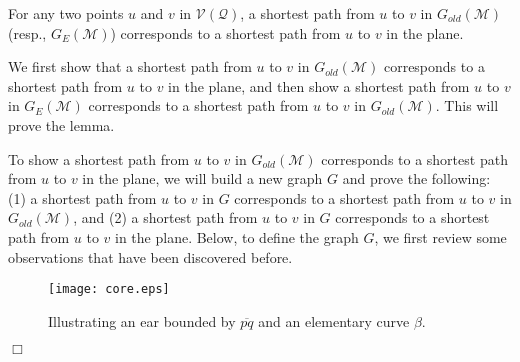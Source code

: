 \documentclass[english,runningheads,11pt]{llncs}
\def\calM{\mathcal{M}}
\def\calQ{\mathcal{Q}}
\def\calV{\mathcal{V}}
\newenvironment{proof}{\noindent {\textbf{Proof:}}\rm}{\hfill $\Box$\rm}
\begin{document}
\begin{lemma}\label{lem:40}
For any two points $u$ and $v$ in $\calV(\calQ)$,
a shortest path from $u$ to $v$ in $G_{old}(\calM)$ (resp., $G_E(\calM)$)
corresponds to a shortest path from $u$ to $v$ in the plane.
\end{lemma}
\begin{proof}
We first show that a shortest path from $u$ to $v$ in
$G_{old}(\calM)$ corresponds to a shortest
path from $u$ to $v$ in the plane, and then show a shortest path from $u$ to $v$ in
$G_E(\calM)$ corresponds to a shortest path from $u$ to $v$ in
$G_{old}(\calM)$. This will prove the lemma.


To show a shortest path from $u$ to $v$ in
$G_{old}(\calM)$ corresponds to a shortest
path from $u$ to $v$ in the plane, we will build a new graph $G$ and
prove the following: (1) a shortest path from $u$ to $v$ in $G$
corresponds to a shortest path from $u$ to $v$ in $G_{old}(\calM)$,
and (2) a shortest path from $u$ to $v$ in $G$ corresponds to a
shortest path from $u$ to $v$ in the plane. Below, to define the
graph $G$, we first review some observations that have been discovered
before.


\begin{figure}[t]
\begin{minipage}[t]{\linewidth}
\begin{center}
\texttt{[image: core.eps]}
\caption{\footnotesize Illustrating an ear bounded by $\overline{pq}$ and an elementary curve $\beta$.}
\label{fig:core}
\end{center}
\end{minipage}
\vspace*{-0.15in}
\end{figure}


\end{proof}
\end{document}

